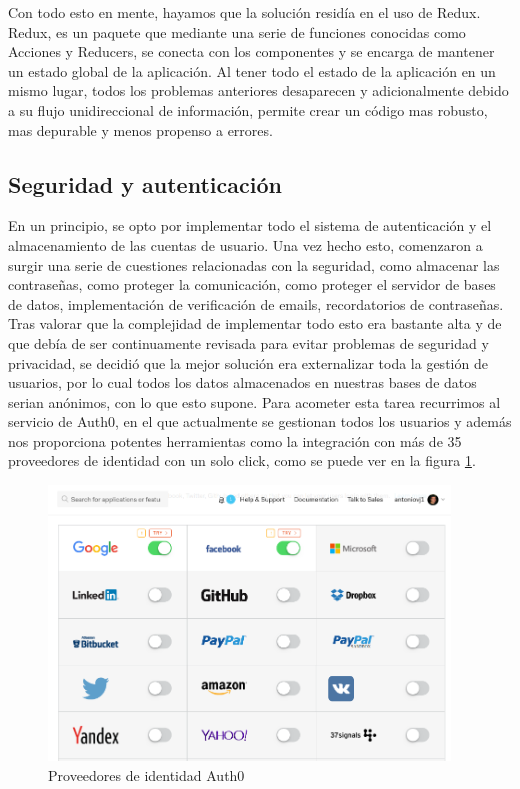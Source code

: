 Con todo esto en mente, hayamos que la solución residía en el uso de Redux. Redux, es un paquete que mediante una serie de funciones conocidas como Acciones y Reducers, se conecta con los componentes y se encarga de mantener un estado global de la aplicación. Al tener todo el estado de la aplicación en un mismo lugar, todos los problemas anteriores desaparecen y adicionalmente debido a su flujo unidireccional de información, permite crear un código mas robusto, mas depurable y menos propenso a errores.

\subsection {Seguridad y autenticación}
En un principio, se opto por implementar todo el sistema de autenticación y el almacenamiento de las cuentas de usuario. Una vez hecho esto, comenzaron a surgir una serie de cuestiones relacionadas con la seguridad, como almacenar las contraseñas, como proteger la comunicación, como proteger el servidor de bases de datos, implementación de verificación de emails, recordatorios de contraseñas.  Tras valorar que la complejidad de implementar todo esto era bastante alta y de que debía de ser continuamente revisada para evitar problemas de seguridad y privacidad, se decidió que la mejor solución era externalizar toda la gestión de usuarios, por lo cual  todos los datos almacenados en nuestras bases de datos serian anónimos, con lo que esto supone. Para acometer esta tarea recurrimos al servicio de Auth0, en el que actualmente se gestionan todos los usuarios y además nos proporciona potentes herramientas como la integración con más de 35 proveedores de identidad con un solo click, como se puede ver en la figura \ref{fig:auth0}.

\begin{figure}
  \begin{center}
    \includegraphics[width=0.95\textwidth]{imagenes/auth0.png}
    \caption{Proveedores de identidad Auth0}
    \label{fig:auth0}
  \end{center}
\end{figure}

